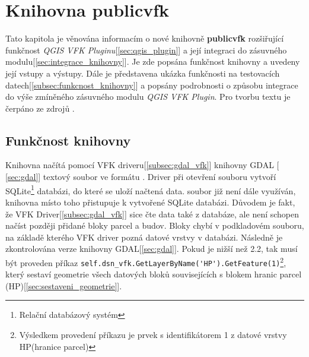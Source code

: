 \chapter{Knihovna publicvfk}
\label{4-plugin}
Tato kapitola je věnována informacím o nové knihovně
\textbf{publicvfk} rozšiřující funkčnost \textit{QGIS VFK Pluginu}[\ref{sec:qgis_plugin}] a její
integraci do zásuvného modulu[\ref{sec:integrace_knihovny}]. Je zde popsána funkčnost knihovny a uvedeny
její vstupy a výstupy. Dále je představena ukázka
funkčnosti na testovacích datech[\ref{subsec:funkcnost_knihovny}] a popsány podrobnosti o způsobu
integrace do výše zmíněného zásuvného modulu \textit{QGIS VFK
  Plugin}. Pro tvorbu textu je čerpáno ze zdrojů \cite{cookbook,
  ucebnicepython}.

\section{Funkčnost knihovny}
\label{sec:funknost_knihovny}
Knihovna načítá pomocí VFK driveru[\ref{subsec:gdal_vfk}] knihovny GDAL [
\ref{sec:gdal}] textový soubor ve formátu . Driver při otevření
souboru vytvoří SQLite\footnote{Relační databázový systém} databázi, do které se uloží načtená data.  soubor již není
dále využíván, knihovna místo toho přistupuje k vytvořené SQLite
databázi. Důvodem je fakt, že VFK Driver[\ref{subsec:gdal_vfk}] sice čte data také z databáze, ale není schopen načíst později přidané bloky parcel a budov. Bloky chybí v podkladovém  souboru, na základě kterého VFK driver pozná datové vrstvy v databázi. Následně je zkontrolována verze knihovny
GDAL[\ref{sec:gdal}]. Pokud je nižší než 2.2, tak musí být proveden
příkaz \verb|self.dsn_vfk.GetLayerByName('HP').GetFeature(1)|\footnote{Výsledkem provedení příkazu je prvek s identifikátorem 1 z datové vrstvy HP(hranice parcel)}, který sestaví geometrie všech datových bloků souvisejících s
blokem hranic parcel (HP)[\ref{sec:sestaveni_geometrie}].

